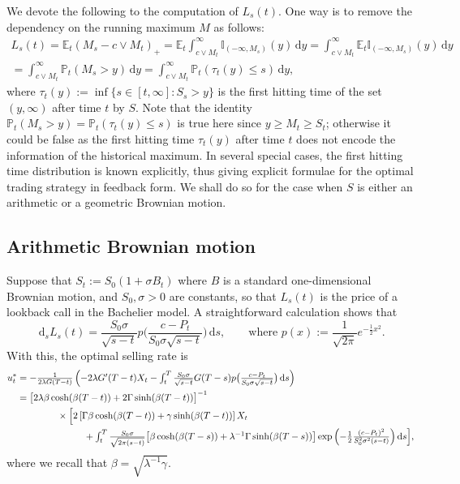\documentclass[openany,oneside]{article}
\theoremstyle{definition}
\theoremstyle{remark}
\newtheorem{rem}[thm]{Remark}
\newcommand{\E}{\mathbb{E}} %
\renewcommand{\P}{\mathbb{P}} %
\newcommand{\I}{\mathbb{I}} %
\newcommand{\ts}{\textstyle}
\newcommand{\de}{\,\mathrm{d}}
\begin{document}

We devote the following to the computation of $L_s(t)$. One way is to remove the dependency on the running maximum $M$ as follows:
\begin{multline*}
\ts L_s(t) = \E_t(M_s-c\vee M_t)_+ = \E_t \int_{c\vee M_t}^{\infty}\I_{(-\infty,M_s)}(y) \de y = \int_{c\vee M_t}^\infty \E_t \I_{(-\infty,M_s)}(y)\de y \\
 \ts = \int_{c\vee M_t}^\infty \P_t(M_s > y) \de y= \int_{c\vee M_t}^\infty \P_t(\tau_t(y) \le s) \de y,
\end{multline*}
where $\tau_t(y):=\inf\{s\in[t,\infty] : S_s> y\}$ is the first hitting time of the set $(y,\infty)$ after time $t$ by $S$. Note that the identity $\P_t(M_s > y) = \P_t(\tau_t(y)\le s)$ is true here since $y\ge M_t\ge S_t$; otherwise it could be false as the first hitting time $\tau_t(y)$ after time $t$ does not encode the information of the historical maximum. In several special cases, the first hitting time distribution is known explicitly, thus giving explicit formulae for the optimal trading strategy in feedback form. We shall do so for the case when $S$ is either an arithmetic or a geometric Brownian motion.

\subsection{Arithmetic Brownian motion}
Suppose that $S_t:=S_0(1+ \sigma B_t)$ where $B$ is a standard one-dimensional Brownian motion, and $S_0, \sigma>0$ are constants, so that $L_s(t)$ is the price of a lookback call in the Bachelier model. A straightforward calculation shows that
\[
 \ts \de_s L_s(t) = \frac{S_0\sigma}{\sqrt{s-t}}p\bigl(\frac{c-P_t}{S_0\sigma\sqrt{s-t}}\bigr)\de s,\qquad\text{where } p(x):=\frac{1}{\sqrt{2\pi}}e^{-\frac{1}{2}x^2}.
\]
With this, the optimal selling rate is
\begin{align*}
u^\ast_t &\ts= -\frac{1}{2\lambda G(T-t)}\left(-2\lambda G'(T-t) X_t - \int_t^T \frac{S_0\sigma}{\sqrt{s-t}} G(T-s) p\bigl(\frac{c-P_t}{S_0\sigma\sqrt{s-t}}\bigr) \de s\right) \\
&= \bigl[2\lambda\beta\cosh(\beta (T-t))+2\Gamma\sinh(\beta (T-t))\bigr]^{-1} \\
&\hspace{1.5cm} \times \Bigl[2\left[\Gamma\beta\cosh(\beta (T-t))+\gamma\sinh(\beta (T-t))\right] X_t\\
&\ts\hspace{2.5cm} + \int_t^T \frac{S_0\sigma}{\sqrt{2\pi(s-t)}}\bigl[\beta\cosh(\beta (T-s))+\lambda^{-1}\Gamma\sinh(\beta (T-s))\bigr] \exp{\left(-\frac{1}{2}\frac{(c-P_t)^2}{S_0^2\sigma^2(s-t)}\right)} \de s \Bigr],
\end{align*}
where we recall that $\beta=\sqrt{\lambda^{-1}\gamma}$.
\end{document}
